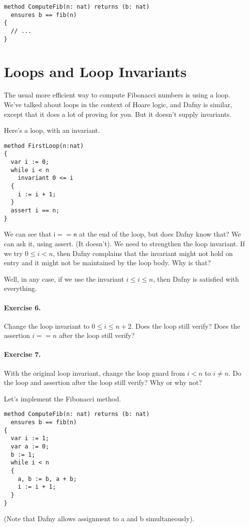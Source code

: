 \documentclass[11pt]{article}
\begin{document}
\begin{lstlisting}[language=dafny]
method ComputeFib(n: nat) returns (b: nat)
  ensures b == fib(n)
{
  // ...
}
\end{lstlisting}

\section*{Loops and Loop Invariants}
The usual more efficient way to compute Fibonacci numbers is using a loop. We've talked
about loops in the context of Hoare logic, and Dafny is similar, except that it does a lot of
proving for you. But it doesn't supply invariants.

Here's a loop, with an invariant.
\begin{lstlisting}[language=dafny]
method FirstLoop(n:nat)
{
  var i := 0;
  while i < n
    invariant 0 <= i
  {
    i := i + 1;
  }
  assert i == n;
}
\end{lstlisting}
We can see that $\mathsf{i == n}$ at the end of the loop, but does Dafny know that? We can ask it, using
\textsf{assert}. (It doesn't). We need to strengthen the loop invariant. If we try $0 \leq i < n$, then
Dafny complains that the invariant might not hold on entry and it might not be maintained by the loop body.
Why is that?

Well, in any case, if we use the invariant $i \leq i \leq n$, then Dafny is satisfied with everything.

\paragraph{Exercise 6.} Change the loop invariant to $0 \leq i \leq n + 2$. Does the loop still verify?
Does the assertion $i == n$ after the loop still verify?

\paragraph{Exercise 7.} With the original loop invariant, change the loop guard from $i < n$ to
$i \neq n$. Do the loop and assertion after the loop still verify? Why or why not?

Let's implement the Fibonacci method.
\begin{lstlisting}[language=dafny]
method ComputeFib(n: nat) returns (b: nat)
  ensures b == fib(n)
{
  var i := 1;
  var a := 0;
  b := 1;
  while i < n
  {
    a, b := b, a + b;
    i := i + 1;
  }
}
\end{lstlisting}
(Note that Dafny allows assignment to \textsf{a} and \textsf{b} simultaneously).
\end{document}
